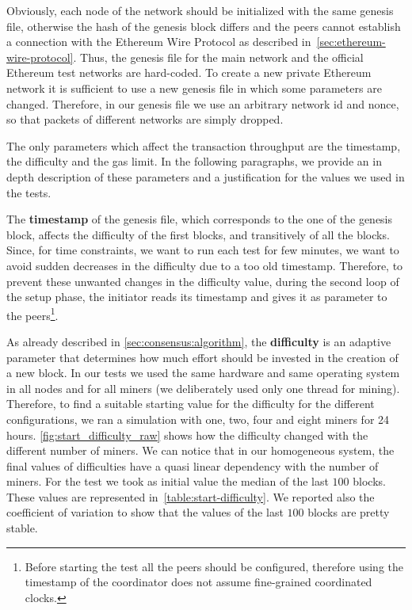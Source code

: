 Obviously, each node of the network should be initialized with the same genesis
file, otherwise the hash of the genesis block differs and the peers cannot
establish a connection with the Ethereum Wire Protocol as described
in~\autoref{sec:ethereum-wire-protocol}. Thus, the genesis file for the main
network and the official Ethereum test networks are hard-coded. To create a new
private Ethereum network it is sufficient to use a new genesis file in which
some parameters are changed. Therefore, in our genesis file we use an arbitrary
network id and nonce, so that packets of different networks are simply dropped.

The only parameters which affect the transaction throughput are the timestamp,
the difficulty and the gas limit. In the following paragraphs, we provide an in
depth description of these parameters and a justification for the values we used
in the tests.


The \textbf{timestamp} of the genesis file, which corresponds to the one of the
genesis block, affects the difficulty of the first blocks, and transitively
of all the blocks. Since, for time constraints, we want to run each test for few
minutes, we want to avoid sudden decreases in the difficulty due to a too old
timestamp. Therefore, to prevent these unwanted changes in the difficulty value,
during the second loop of the setup phase, the initiator reads its timestamp and
gives it as parameter to the peers\footnote{Before starting the test all the
peers should be configured, therefore using the timestamp of the coordinator
does not assume fine-grained coordinated clocks.}.

As already described in \autoref{sec:consensus:algorithm}, the
\textbf{difficulty} is an adaptive parameter that determines how much effort
should be invested in the creation of a new block. In our tests we used the same
hardware and same operating system in all nodes and for all miners (we
deliberately used only one thread for mining). Therefore, to find a suitable
starting value for the difficulty for the different configurations, we ran a
simulation with one, two, four and eight miners for 24 hours.
\autoref{fig:start_difficulty_raw} shows how the difficulty changed with the
different number of miners. We can notice that in our homogeneous system, the
final values of difficulties have a quasi linear dependency with the number of
miners. For the test we took as initial value the median of the last $100$
blocks. These values are represented in~\autoref{table:start-difficulty}. We
reported also the coefficient of variation to show that the values of the last
$100$ blocks are pretty stable.

